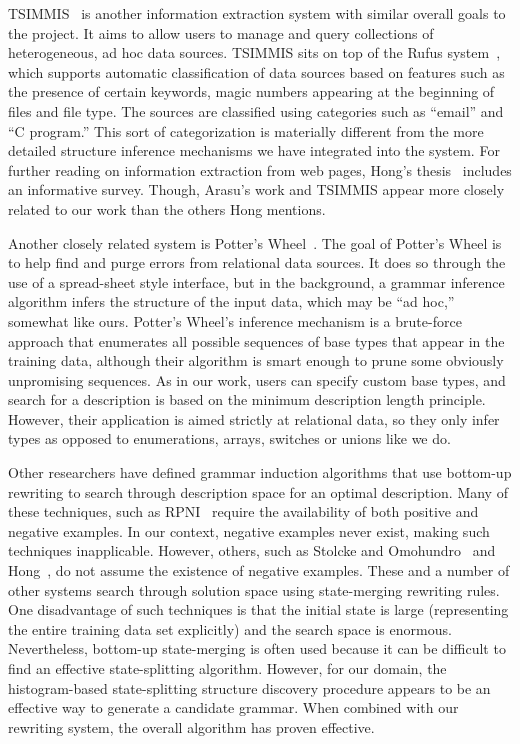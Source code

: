 TSIMMIS~\cite{chawathe+:tsimmis} is another information extraction
system with similar overall goals to the \pads{} project.  It aims to
allow users to manage and query collections of heterogeneous, ad hoc
data sources.  TSIMMIS sits on top of the Rufus
system~\cite{shoens+:rufus}, which supports automatic classification
of data sources based on features such as the presence of certain
keywords, magic numbers appearing at the beginning of files and file
type.  The sources are classified using categories such as ``email''
and ``C program.''  This sort of categorization is materially
different from the more detailed structure inference mechanisms we
have integrated into the \pads{} system.  For further reading on
information extraction from web pages, Hong's
thesis~\cite{hong:thesis} includes an informative survey.  Though,
Arasu's work and TSIMMIS appear more closely related to our work than
the others Hong mentions.

Another closely related system is Potter's Wheel~\cite{raman+:potterwheel}.
The goal of Potter's Wheel is to help find and purge errors from
relational data sources.  It does so through the use of a spread-sheet
style interface, but in the background, a grammar inference algorithm
infers the structure of the input data, which may be ``ad hoc,'' 
somewhat like ours.  Potter's Wheel's inference mechanism is a brute-force
approach that enumerates all possible sequences of base types that appear
in the training data, although their algorithm is smart enough to
prune some obviously unpromising sequences.  As in our work,
users can specify custom base types, and search for a description
is based on the minimum description length principle.  However,
their application is aimed
strictly at relational data, so they only infer  types
as opposed to enumerations, arrays, switches or unions like we do.  

Other researchers have defined grammar induction algorithms that use
bottom-up rewriting to search through description space for an optimal
description.  Many of these techniques, such as RPNI~\cite{rpni} 
require the availability of both
positive and negative examples.  In our context, negative examples
never exist, making such techniques inapplicable.
However, others, such as Stolcke and
Omohundro~\cite{stolcke94inducing} and Hong~\cite{hong01using}, do not
assume the existence of negative examples.  These and a number of other systems
search through solution space using
state-merging rewriting rules.  One disadvantage of such
techniques is that the initial state is large (representing
the entire training data set explicitly) and the search space is 
enormous.  Nevertheless, bottom-up state-merging is often used because
it can be difficult to find an effective state-splitting algorithm.
However, for our domain, the histogram-based state-splitting structure
discovery procedure appears to be an effective way to generate a candidate
grammar.  When combined with our rewriting system, the overall
algorithm has proven effective.

